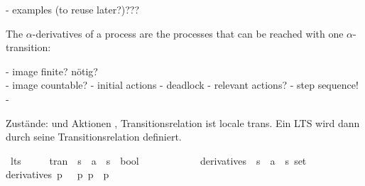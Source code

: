 \begin{isabellebody}
\begin{isamarkuptext}
- examples (to reuse later?)???%
\end{isamarkuptext}\isamarkuptrue%
%
\isadelimdocument
%
\endisadelimdocument
%
\isatagdocument
%
\isamarkuptrue%
%
\endisatagdocument
{\isafolddocument}%
%
\isadelimdocument
%
\endisadelimdocument
%
\begin{isamarkuptext}%
The $\alpha$-derivatives of a process are the processes that can be reached with one $\alpha$-transition:%
\end{isamarkuptext}\isamarkuptrue%
%
\begin{isamarkuptext}%
- image finite? nötig?\\
- image countable?
- initial actions
- deadlock
- relevant actions?
- step sequence!
-%
\end{isamarkuptext}\isamarkuptrue%
%
\isadelimdocument
%
\endisadelimdocument
%
\isatagdocument
%
\isamarkuptrue%
%
\endisatagdocument
{\isafolddocument}%
%
\isadelimdocument
%
\endisadelimdocument
%
\begin{isamarkuptext}%
Zustände:  und Aktionen , Transitionsrelation ist locale trans. Ein LTS wird dann durch
seine Transitionsrelation definiert.%
\end{isamarkuptext}\isamarkuptrue%
\isamarkupfalse%
\ lts\ {\isacharequal}{\kern0pt}\ \isanewline
\ \ \ tran\ {\isacharcolon}{\kern0pt}{\isacharcolon}{\kern0pt}\ {\isacartoucheopen}{\isacharprime}{\kern0pt}s\ {\isasymRightarrow}\ {\isacharprime}{\kern0pt}a\ {\isasymRightarrow}\ {\isacharprime}{\kern0pt}s\ {\isasymRightarrow}\ bool{\isacartoucheclose}\isanewline
\ \ \ \ {\isacharparenleft}{\kern0pt}{\isachardoublequoteopen}{\isacharunderscore}{\kern0pt}\ {\isasymmapsto}{\isacharunderscore}{\kern0pt}\ {\isacharunderscore}{\kern0pt}{\isachardoublequoteclose}\ {\isacharbrackleft}{\kern0pt}{}{}{\isacharcomma}{\kern0pt}\ {}{}{\isacharcomma}{\kern0pt}\ {}{}{\isacharbrackright}{\kern0pt}\ {}{}{\isacharparenright}{\kern0pt}\isanewline
{}\isanewline
\isanewline
{}\isamarkupfalse%
\ derivatives\ {\isacharcolon}{\kern0pt}{\isacharcolon}{\kern0pt}\ {\isacartoucheopen}{\isacharprime}{\kern0pt}s\ {\isasymRightarrow}\ {\isacharprime}{\kern0pt}a\ {\isasymRightarrow}\ {\isacharprime}{\kern0pt}s\ set{\isacartoucheclose}\isanewline
\ \ \isanewline
{\isacartoucheopen}derivatives\ p\ {\isasymalpha}\ {\isasymequiv}\ {\isacharbraceleft}{\kern0pt}p{\isacharprime}{\kern0pt}{\isachardot}{\kern0pt}\ p\ {\isasymmapsto}{\isasymalpha}\ p{\isacharprime}{\kern0pt}{\isacharbraceright}{\kern0pt}{\isacartoucheclose}%

\end{isabellebody}
